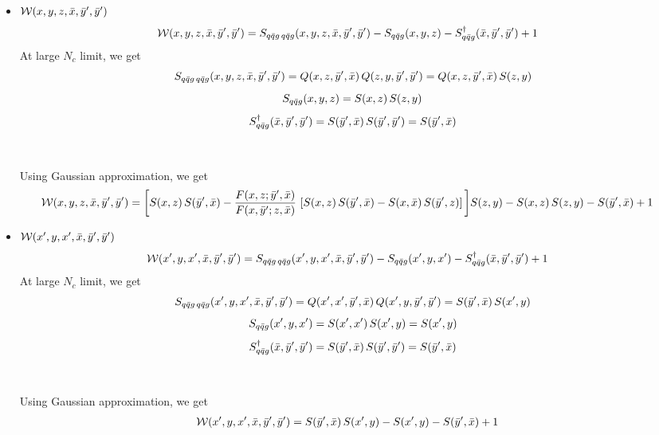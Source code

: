 \documentclass[9pt]{article}
\numberwithin{equation}{section}
\begin{document}
\begin{itemize}
Using Gaussian approximation, we get
\begin{align}
   \mathcal{W}(x',y,x',\Bar{x},\Bar{y},\Bar{z}) & = S(\Bar{z},\Bar{x})\,\bigg[S(x',y)\,S(\Bar{y},\Bar{z}) - \frac{F(x',y;\Bar{y},\Bar{z})}{F(x',\Bar{y};y,\Bar{z})}\,\left[S(x',y)\,S(\Bar{y},\Bar{z})-S(x',\Bar{z})\,S(\Bar{y},y)\right]\bigg] - S(x',y) - S(\Bar{z},\Bar{x})\, S(\Bar{y},\Bar{z}) + 1  
\end{align}
\item $\mathcal{W}(x,y,z,\Bar{x},\Bar{y}',\Bar{y}')$
\begin{align}
        \mathcal{W}(x,y,z,\Bar{x},\Bar{y}',\Bar{y}') & = S_{q\Bar{q}g\,q\Bar{q}g}(x,y,z,\Bar{x},\Bar{y}',\Bar{y}') -S_{q\Bar{q}g}(x,y,z) - S^{\dagger}_{q\Bar{q}g}(\Bar{x},\Bar{y}',\Bar{y}') + 1
    \end{align}
At large $N_{c}$ limit, we get
$$S_{q\Bar{q}g\,q\Bar{q}g}(x,y,z,\Bar{x},\Bar{y}',\Bar{y}') = Q(x,z,\Bar{y}',\Bar{x})\, Q(z,y,\Bar{y}',\Bar{y}') = Q(x,z,\Bar{y}',\Bar{x})\, S(z,y) $$
$$S_{q\Bar{q}g}(x,y,z) = S(x,z)\, S(z,y)$$
$$S^{\dagger}_{q\Bar{q}g}(\Bar{x},\Bar{y}',\Bar{y}') = S(\Bar{y}',\Bar{x})\, S(\Bar{y}',\Bar{y}') = S(\Bar{y}',\Bar{x})$$
\\ \\
Using Gaussian approximation, we get
\begin{align}
    \mathcal{W}(x,y,z,\Bar{x},\Bar{y}',\Bar{y}') & = \bigg[S(x,z)\,S(\Bar{y}',\Bar{x}) - \frac{F(x,z;\Bar{y}',\Bar{x})}{F(x,\Bar{y}';z,\Bar{x})}\, \left[S(x,z)\,S(\Bar{y}',\Bar{x})-S(x,\Bar{x})\,S(\Bar{y}',z)\right]\bigg] S(z,y) -  S(x,z)\, S(z,y) - S(\Bar{y}',\Bar{x}) +1 
\end{align}
\item $\mathcal{W}(x',y,x',\Bar{x},\Bar{y}',\Bar{y}')$
    \begin{align}
        \mathcal{W}(x',y,x',\Bar{x},\Bar{y}',\Bar{y}') & = S_{q\Bar{q}g\,q\Bar{q}g}(x',y,x',\Bar{x},\Bar{y}',\Bar{y}') -S_{q\Bar{q}g}(x',y,x') - S^{\dagger}_{q\Bar{q}g}(\Bar{x},\Bar{y}',\Bar{y}') + 1
    \end{align}
At large $N_{c}$ limit, we get
$$S_{q\Bar{q}g\,q\Bar{q}g}(x',y,x',\Bar{x},\Bar{y}',\Bar{y}') = Q(x',x',\Bar{y}',\Bar{x})\, Q(x',y,\Bar{y}',\Bar{y}') = S(\Bar{y}',\Bar{x})\, S(x',y) $$
$$S_{q\Bar{q}g}(x',y,x') = S(x',x')\, S(x',y) = S(x',y)$$
$$S^{\dagger}_{q\Bar{q}g}(\Bar{x},\Bar{y}',\Bar{y}') = S(\Bar{y}',\Bar{x})\, S(\Bar{y}',\Bar{y}') = S(\Bar{y}',\Bar{x}) $$
\\ \\
Using Gaussian approximation, we get 
\begin{align}
    \mathcal{W}(x',y,x',\Bar{x},\Bar{y}',\Bar{y}') & = S(\Bar{y}',\Bar{x})\, S(x',y) - S(x',y) - S(\Bar{y}',\Bar{x}) +1
\end{align}
\end{itemize}
\end{document}
